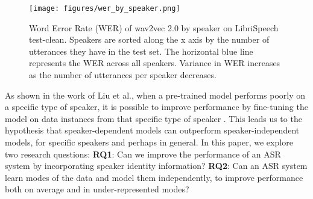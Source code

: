 \begin{figure}[h]
      \centering
      \texttt{[image: figures/wer\_by\_speaker.png]}
      \caption{
          Word Error Rate (WER) of wav2vec 2.0 by speaker on LibriSpeech test-clean.
          Speakers are sorted along the x axis by the number of utterances they have in the test set.
          The horizontal blue line represents the WER across all speakers.
          Variance in WER increases as the number of utterances per speaker decreases.
  }
      \label{fig:by_speaker}
\end{figure}

As shown in the work of Liu et al., when a pre-trained model performs poorly on a specific type of speaker, 
it is possible to improve performance by fine-tuning the model on data instances from that specific type of speaker \cite{childspeech}.
This leads us to the hypothesis that speaker-dependent models can outperform speaker-independent models, for specific speakers and perhaps in general.
In this paper, we explore two research questions:
\textbf{RQ1}: Can we improve the performance of an ASR system by incorporating speaker identity information?
\textbf{RQ2}: Can an ASR system learn modes of the data and model them independently, to improve performance both on average and in under-represented modes?

